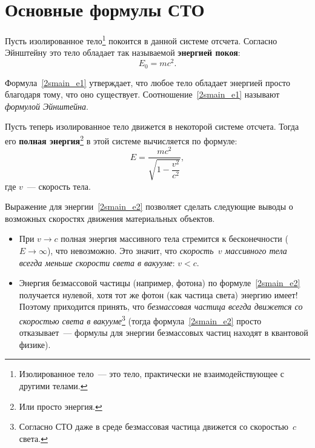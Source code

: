 \documentclass[main.tex]{subfiles}
\begin{document}

 


\setcounter{section}{14
}
\addtocounter{section}{-1} 

\section{Основные формулы СТО}


Пусть изолированное тело\footnote{Изолированное тело~--- это тело, практически не взаимодействующее с другими телами.} покоится в данной системе отсчета. Согласно Эйнштейну это тело обладает так называемой \textbf{энергией покоя}:
\begin{equation}
    \label{2smain_e1}
    E_0=mc^2.
\end{equation}

Формула~\eqref{2smain_e1} утверждает, что любое тело обладает энергией просто благодаря тому, что оно существует. Соотношение~\eqref{2smain_e1} называют \emph{формулой Эйнштейна}.

Пусть теперь изолированное тело движется в некоторой системе отсчета. Тогда его \textbf{полная энергия}\footnote{Или просто энергия.} в этой системе вычисляется по формуле:
\begin{equation}
    \label{2smain_e2}
    E=\frac{mc^2}{\sqrt{1-\dfrac{v^2}{c^2}}},
\end{equation}
где $v$~--- скорость тела.

Выражение для энергии~\eqref{2smain_e2} позволяет сделать следующие выводы о возможных скоростях движения материальных объектов.
\begin{itemize}
    \item При $v\to c$ полная энергия массивного тела стремится к бесконечности ($E\to\infty$), что невозможно. Это значит, что \emph{скорость~$v$ массивного тела всегда меньше скорости света в вакууме}: $v<c$.
    \item Энергия безмассовой частицы (например, фотона) по формуле~\eqref{2smain_e2} получается нулевой, хотя тот же фотон (как частица света) энергию имеет! Поэтому приходится принять, что \emph{безмассовая частица всегда движется со скоростью света в вакууме}\footnote{Согласно СТО даже в среде безмассовая частица движется со скоростью~$c$ света.} (тогда формула~\eqref{2smain_e2} просто отказывает~--- формулы для энергии безмассовых частиц находят в квантовой физике).   
\end{itemize}
\end{document}
